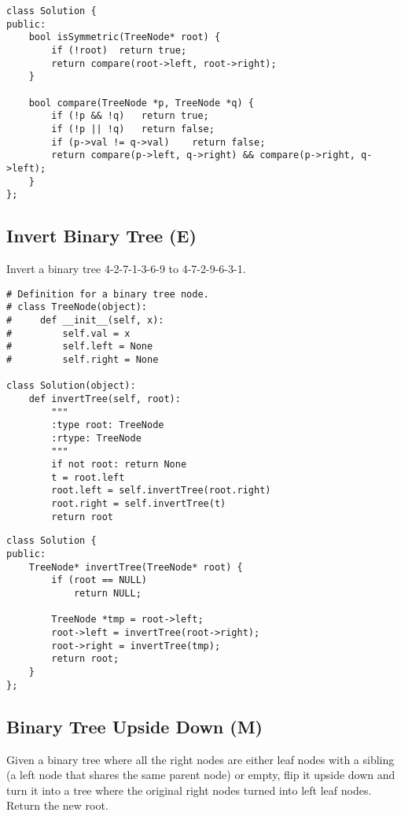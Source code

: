 \begin{lstlisting}
class Solution {
public:
    bool isSymmetric(TreeNode* root) {
        if (!root)  return true;
        return compare(root->left, root->right);
    }
    
    bool compare(TreeNode *p, TreeNode *q) {
        if (!p && !q)   return true;
        if (!p || !q)   return false;
        if (p->val != q->val)    return false;
        return compare(p->left, q->right) && compare(p->right, q->left);
    }
};
\end{lstlisting}


\subsection{Invert Binary Tree (E)}
Invert a binary tree 4-2-7-1-3-6-9 to 4-7-2-9-6-3-1. \\

\begin{lstlisting}
# Definition for a binary tree node.
# class TreeNode(object):
#     def __init__(self, x):
#         self.val = x
#         self.left = None
#         self.right = None

class Solution(object):
    def invertTree(self, root):
        """
        :type root: TreeNode
        :rtype: TreeNode
        """
        if not root: return None
        t = root.left
        root.left = self.invertTree(root.right)
        root.right = self.invertTree(t)
        return root
\end{lstlisting}

\begin{lstlisting}
class Solution {
public:
    TreeNode* invertTree(TreeNode* root) {
        if (root == NULL)
            return NULL;
            
        TreeNode *tmp = root->left;
        root->left = invertTree(root->right);
        root->right = invertTree(tmp);
        return root;
    }
};
\end{lstlisting}


\subsection{Binary Tree Upside Down (M)}
Given a binary tree where all the right nodes are either leaf nodes with a sibling (a left node that shares the same parent node) or empty, flip it upside down and turn it into a tree where the original right nodes turned into left leaf nodes. Return the new root.\\

